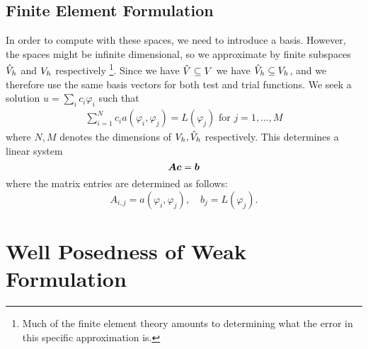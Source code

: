 \subsection{Finite Element Formulation}
\label{sub:finite_element_formulation}

In order to compute with these spaces, we need to introduce a basis. However,
the spaces might be infinite dimensional, so we approximate by finite subspaces
\( \hat{V}_h \) and \(V_h\) respectively%
%
\footnote{Much of the finite element theory amounts to determining what the
error in this specific approximation is.}. %
%
Since we have \( \hat{V} \subseteq V \) we have \( \hat{V}_h \subseteq
V_h \), and we therefore use the same basis vectors for both test and
trial functions. We seek a solution \( u = \sum_i c_i \varphi_i \) such that
\begin{align}
    \sum_{i=1}^{N} c_i a(\varphi_i, \varphi_j) = L(\varphi_j) \text{ for } j = 1, \dots, M
\end{align}
where \(N, M\) denotes the dimensions of \(V_h, \hat{V}_h\) respectively.
This determines a linear system
\begin{equation}
    \boldsymbol{A} \boldsymbol{c} = \boldsymbol{b}
\end{equation}
where the matrix entries are determined as follows:
\begin{equation}
    A_{i, j} = a(\varphi_i, \varphi_j), \quad b_j = L(\varphi_j).
\end{equation}

\section{Well Posedness of Weak Formulation}
\label{sec:well_posedness_of_weak_formulation}

